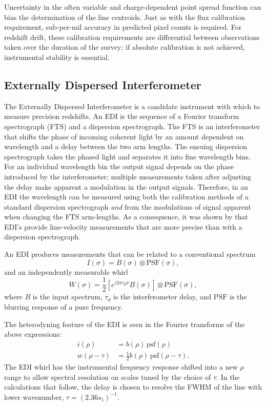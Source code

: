 \documentclass[preprint]{aastex}
\begin{document}
Uncertainty in the often variable and charge-dependent point spread function can
bias the determination of the line centroids.  Just as with the flux calibration requirement, sub-per-mil accuracy in predicted pixel counts
is required.  For redshift drift, these calibration requirements are differential between observations taken
over the duration of the survey: if absolute calibration is not achieved, instrumental stability is essential.


\subsection{Externally Dispersed Interferometer}
The Externally Dispersed Interferometer \citep[EDI;][]{2003PASP..115..255E} is a candidate instrument with which to measure precision redshifts.
An EDI is the sequence of a Fourier transform spectrograph (FTS) and a dispersion spectrograph.  The FTS is an interferometer that shifts
the phase of incoming coherent light
by an amount dependent on wavelength and a  delay between the two arm lengths.
The ensuing dispersion spectrograph takes the phased light and separates it into fine wavelength bins.
For an individual wavelength bin the output signal depends on the phase introduced by the interferometer; multiple
measurements taken after adjusting the delay  make apparent a modulation in the output signals.
Therefore, in an EDI the wavelength can be measured using both the calibration methods of a standard dispersion
spectrograph {\it and} from the modulations of signal apparent when changing the FTS arm-lengths.   As a consequence,
it was shown by
\citet{2003PASP..115..255E} that EDI's provide line-velocity measurements that are more precise than with a dispersion spectrograph.

An EDI produces measurements that can be related
to a conventional spectrum
\begin{equation}
I(\sigma) = B(\sigma) \otimes \mbox{PSF}(\sigma),
\end{equation}
and an independently measurable whirl
\begin{equation}
W(\sigma) = \frac{1}{2}\left[e^{i2\pi\tau_d\sigma}B(\sigma)\right] \otimes \mbox{PSF}(\sigma),
\end{equation}
where $B$ is the input spectrum, $\tau_d$ is the interferometer delay, and $\mbox{PSF}$  is the blurring
response of a pure frequency.

The heterodyning feature of the EDI is seen in the Fourier transforms of the above expressions:
\begin{align}
i(\rho) & =b(\rho) \, \mbox{psf}(\rho)\\
w(\rho -\tau) & =\frac{1}{2} b(\rho) \, \mbox{psf}(\rho-\tau).
\end{align}
The EDI whirl has the instrumental frequency response shifted into a new $\rho$ range to allow
spectral
resolution on scales tuned by the choice of $\tau$.  In the calculations that follow, the delay is chosen to resolve
the FWHM of the line with lower wavenumber, $\tau = (2.36s_1)^{-1}$.
\end{document}
